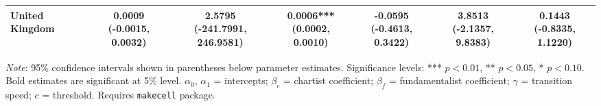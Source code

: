 \begin{table}[htbp]
{\begin{tabular}{l|cccccc}
United Kingdom       & \makecell{0.0009 \\ \scriptsize{(-0.0015, 0.0032)}} & \makecell{2.5795 \\ \scriptsize{(-241.7991, 246.9581)}} & \makecell{\textbf{0.0006}*** \\ \scriptsize{(0.0002, 0.0010)}} & \makecell{-0.0595 \\ \scriptsize{(-0.4613, 0.3422)}} & \makecell{3.8513 \\ \scriptsize{(-2.1357, 9.8383)}} & \makecell{0.1443 \\ \scriptsize{(-0.8335, 1.1220)}} \\
\bottomrule
\end{tabular}%
}
\begin{tablenotes}
\small
\textit{Note}: 95\% confidence intervals shown in parentheses below parameter estimates. 
Significance levels: *** $p<0.01$, ** $p<0.05$, * $p<0.10$. 
Bold estimates are significant at 5\% level.
$\alpha_0$, $\alpha_1$ = intercepts; $\beta_c$ = chartist coefficient; 
$\beta_f$ = fundamentalist coefficient; $\gamma$ = transition speed; $c$ = threshold.
Requires \texttt{makecell} package.
\end{tablenotes}
\end{table}
